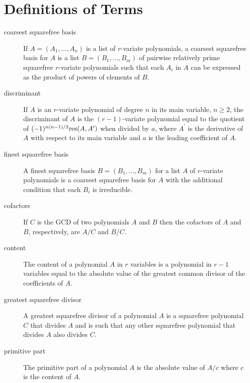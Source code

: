 \section{Definitions of Terms}
\begin{description}

  \item[coarsest squarefree basis]
 If $A = (A_1,\ldots,A_n)$ is a list of
$r$-variate polynomials, a coarsest squarefree basis for $A$ is a list
$B = (B_1,\ldots,B_m)$ of pairwise relatively prime squarefree $r$-variate
polynomials such that each $A_i$ in $A$ can be expressed as the
product of powers of elements of $B$.

  \item[discriminant] If $A$ is an $r$-variate polynomial of degree
$n$ in its main variable, $n \geq 2$, the discriminant of $A$ is the
$(r-1)$-variate polynomial equal to the quotient of
$(-1)^{n(n-1)/2}{\rm res}(A,A^\prime)$ when divided by $a$, where
$A^\prime$ is the derivative of $A$ with respect to its main variable
and $a$ is the leading coefficient of $A$.

  \item[finest squarefree basis]
 A finest squarefree basis $B = (B_1,
\ldots, B_m)$ for a list $A$ of $r$-variate polynomials is a coarsest
squarefree basis for $A$ with the additional condition that each $B_i$
is irreducible.

  \item[cofactors] If $C$ is the GCD of two polynomials $A$ and $B$ then
the cofactors of $A$ and $B$, respectively, are $A/C$ and $B/C$.

  \item[content] The content of a polynomial $A$ in $r$ variables is a
polynomial in $r-1$ variables equal to the absolute value of the
greatest common divisor of the coefficients of $A$.

  \item[greatest squarefree divisor]
 A greatest squarefree divisor of
a polynomial $A$ is a squarefree polynomial $C$ that divides $A$ and
is such that any other squarefree polynomial that divides $A$ also
divides $C$.

  \item[primitive part]
 The primitive part of a polynomial $A$ is the
absolute value of $A/c$ where $c$ is the content of $A$.


\end{description}
